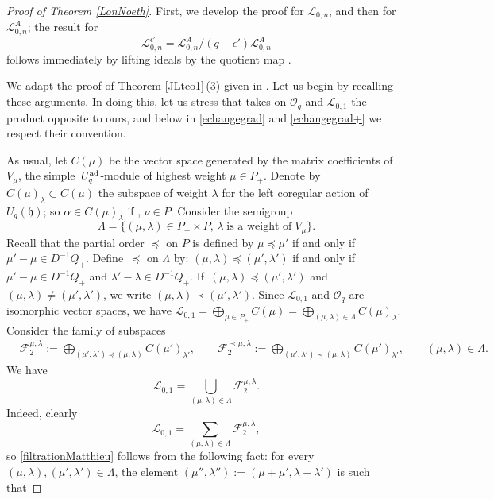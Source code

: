 \documentclass[pdftex]{sigma}
\numberwithin{equation}{section}
\theoremstyle{definition}
\newcommand{\ep}{{\epsilon'}}
\newcommand{\Ll}{{\mathcal L}}
\newcommand{\ra}{\rightarrow}
\begin{document}
\begin{proof}[Proof of Theorem \ref{LonNoeth}] First, we develop the proof for $\Ll_{0,n}$, and then for $\Ll_{0,n}^A$; the result for%
\[\Ll_{0,n}^\ep\!= \Ll_{0,n}^A/(q-\ep)\Ll_{0,n}^A
\]
 follows immediately by lifting ideals by the quotient map \smash{$\Ll_{0,n}^A \!\ra \Ll_{0,n}^\ep$}.

We adapt the proof of Theorem \ref{JLteo1}\,(3) given in \cite[Theorem 3.137]{VY}. Let us begin by recalling these arguments. In doing this, let us stress that \cite{VY} takes on ${\mathcal O}_q$ and $\Ll_{0,1}$ the product opposite to ours, and below in \eqref{echangegrad} and \eqref{echangegrad+} we respect their convention.

As usual, let $C(\mu)$ be the vector space generated by the matrix coefficients of $V_\mu$, the simple~$U_q^{\rm ad}$-module of highest weight $\mu \in P_+$. Denote by $C(\mu)_\lambda \subset C(\mu)$ the subspace of weight $\lambda$ for the left coregular action of $U_q({\mathfrak h})$; so $\alpha\in C(\mu)_\lambda$ if , $\nu\in P$. Consider the semigroup
\[\Lambda=\{(\mu, \lambda)\in P_+\times P, \, \lambda \;\text{is a weight of}\;V_\mu\}.\]
Recall that the partial order $\preceq$ on $P$ is defined by $\mu\preceq \mu'$ if and only if $\mu'-\mu\in D^{-1}Q_+$. Define~$\preceq$ on $\Lambda$ by: $(\mu,\lambda)\preceq (\mu', \lambda')$ if and only if $\mu'-\mu\in D^{-1}Q_+$ and $\lambda'-\lambda\in D^{-1}Q_+$. If~${(\mu,\lambda)\preceq (\mu', \lambda')}$ and $(\mu,\lambda)\ne (\mu', \lambda')$, we write $(\mu,\lambda)\prec (\mu', \lambda')$. Since ${\mathcal L}_{0,1}$ and ${\mathcal O}_q$ are isomorphic vector spaces, we have $ {\mathcal L}_{0,1}=\bigoplus_{\mu\in P_+} C(\mu)=\bigoplus_{(\mu,\lambda)\in \Lambda} C(\mu)_\lambda$. Consider the family of subspaces
\begin{align*}
& {\mathcal F}_2^{\mu,\lambda} :=\bigoplus_{(\mu',\lambda')\preceq (\mu,\lambda)} C(\mu')_{\lambda'} , \qquad{\mathcal F}_2^{\prec \mu,\lambda}:=\bigoplus_{(\mu',\lambda')\prec (\mu,\lambda)} C(\mu')_{\lambda'} , \qquad (\mu,\lambda)\in \Lambda.
\end{align*}
We have
\begin{equation}\label{filtrationMatthieu}
{\mathcal L}_{0,1} = \bigcup_{(\mu,\lambda)\in \Lambda} {\mathcal F}_2^{\mu,\lambda}.
\end{equation}
Indeed, clearly
\[ {\mathcal L}_{0,1} = \sum_{(\mu,\lambda)\in \Lambda} {\mathcal F}_2^{\mu,\lambda},
\]
 so \eqref{filtrationMatthieu} follows from the following fact: for every $(\mu,\lambda), (\mu',\lambda')\in \Lambda$, the element $(\mu'',\lambda''):= (\mu+\mu',\lambda+\lambda')$ is such that

\end{proof}
\end{document}

